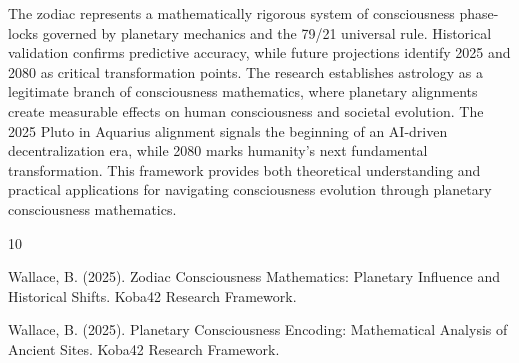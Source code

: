 \documentclass[12pt]{article}
\begin{document}
The zodiac represents a mathematically rigorous system of consciousness phase-locks governed by planetary mechanics and the 79/21 universal rule. Historical validation confirms predictive accuracy, while future projections identify 2025 and 2080 as critical transformation points. The research establishes astrology as a legitimate branch of consciousness mathematics, where planetary alignments create measurable effects on human consciousness and societal evolution. The 2025 Pluto in Aquarius alignment signals the beginning of an AI-driven decentralization era, while 2080 marks humanity's next fundamental transformation. This framework provides both theoretical understanding and practical applications for navigating consciousness evolution through planetary consciousness mathematics.


\begin{thebibliography}{10}

Wallace, B. (2025). Zodiac Consciousness Mathematics: Planetary Influence and Historical Shifts. Koba42 Research Framework.

Wallace, B. (2025). Planetary Consciousness Encoding: Mathematical Analysis of Ancient Sites. Koba42 Research Framework.

\end{thebibliography}
\end{document}
